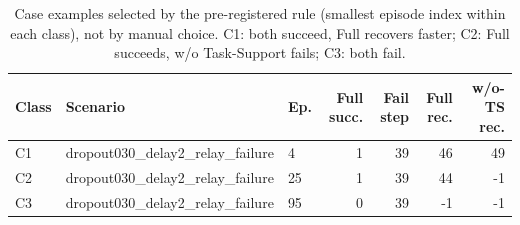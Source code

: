 \begin{table}[t]
\centering
\small
\caption{Case examples selected by the pre-registered rule (smallest episode index within each class), not by manual choice. C1: both succeed, Full recovers faster; C2: Full succeeds, w/o Task-Support fails; C3: both fail.}
\label{tab:s2_cases}
\begin{tabular}{lllrrrr}
\toprule
Class & Scenario & Ep. & Full succ. & Fail step & Full rec. & w/o-TS rec. \\
\midrule
C1 & dropout030_delay2_relay_failure & 4 & 1 & 39 & 46 & 49 \\
C2 & dropout030_delay2_relay_failure & 25 & 1 & 39 & 44 & -1 \\
C3 & dropout030_delay2_relay_failure & 95 & 0 & 39 & -1 & -1 \\
\bottomrule
\end{tabular}
\end{table}